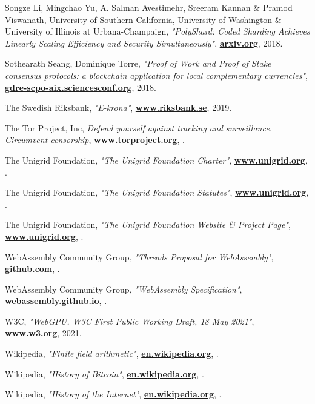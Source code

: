 \documentclass[10pt,a4paper,final]{article}
\let\oldhref\href
\renewcommand{\href}[2]{\oldhref{#1}{\bfseries#2}}
\begin{document}
\begin{thebibliography}{999}
	Songze Li, Mingchao Yu, A. Salman Avestimehr, Sreeram Kannan \& Pramod Viswanath, University of Southern California, University of Washington \& University of Illinois at Urbana-Champaign,
	\emph{"PolyShard: Coded Sharding Achieves Linearly Scaling Efficiency and Security Simultaneously"},
	\href{https://arxiv.org/pdf/1809.10361.pdf}{arxiv.org},
	2018.

	Sothearath Seang, Dominique Torre,
	\emph{"Proof of Work and Proof of Stake consensus protocols: a blockchain application for local complementary currencies"},
	\href{https://gdre-scpo-aix.sciencesconf.org/195470/document}{gdre-scpo-aix.sciencesconf.org},
	2018.

	The Swedish Riksbank,
	\emph{"E-krona"},
	\href{https://www.riksbank.se/en-gb/payments--cash/e-krona}{www.riksbank.se},
	2019.

	The Tor Project, Inc,
	\emph{Defend yourself against tracking and surveillance. Circumvent censorship},
	\href{https://www.torproject.org}{www.torproject.org},
	\the\year{}.

	The Unigrid Foundation,
	\emph{"The Unigrid Foundation Charter"},
	\href{https://www.unigrid.org/link-not-yet-available}{www.unigrid.org},
	\the\year{}.

	The Unigrid Foundation,
	\emph{"The Unigrid Foundation Statutes"},
	\href{https://www.unigrid.org/link-not-yet-available}{www.unigrid.org},
	\the\year{}.

	The Unigrid Foundation,
	\emph{"The Unigrid Foundation Website \& Project Page"},
	\href{https://www.unigrid.org}{www.unigrid.org},
	\the\year{}.

	WebAssembly Community Group,
	\emph{"Threads Proposal for WebAssembly"},
	\href{https://github.com/WebAssembly/threads}{github.com},
	\the\year{}.

	WebAssembly Community Group,
	\emph{"WebAssembly Specification"},
	\href{https://webassembly.github.io/spec/core/_download/WebAssembly.pdf}{webassembly.github.io},
	\the\year{}.

	W3C,
	\emph{"WebGPU, W3C First Public Working Draft, 18 May 2021"},
	\href{https://www.w3.org/TR/2021/WD-webgpu-20210518/}{www.w3.org},
	2021.

	Wikipedia,
	\emph{"Finite field arithmetic"},
	\href{https://en.wikipedia.org/wiki/Finite_field_arithmetic}{en.wikipedia.org},
	\the\year{}.

	Wikipedia,
	\emph{"History of Bitcoin"},
	\href{https://en.wikipedia.org/wiki/History_of_bitcoin}{en.wikipedia.org},
	\the\year{}.

	Wikipedia,
	\emph{"History of the Internet"},
	\href{https://en.wikipedia.org/wiki/History_of_the_Internet}{en.wikipedia.org},
	\the\year{}.

\end{thebibliography}

\clearpage
\printglossaries
\end{document}
